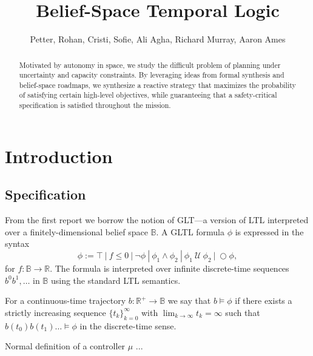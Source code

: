 \documentclass[conference]{IEEEtran}
\newcommand{\notltl}{\neg}
\newcommand{\andltl}{\wedge}
\newcommand{\Next}{\ensuremath{\bigcirc}}
\newcommand{\Until}{\ \mathcal{U}\ }
\newcommand{\True}{\top}
\begin{document}
\title{\huge Belief-Space Temporal Logic }

\author{Petter, Rohan, Cristi, Sofie, Ali Agha, Richard Murray, Aaron Ames}

\maketitle

\begin{abstract}
Motivated by autonomy in space, we study the difficult problem of planning under uncertainty and capacity constraints. By leveraging ideas from formal synthesis and belief-space roadmaps, we synthesize a reactive strategy that maximizes the probability of satisfying certain high-level objectives, while guaranteeing that a safety-critical specification is satisfied throughout the mission.  
\end{abstract}

\IEEEpeerreviewmaketitle

	
\section{Introduction} \label{subsec:intro}

\subsection{Specification}

From the first report we borrow the notion of GLT---a version of LTL interpreted over a finitely-dimensional belief space $\mathbb{B}$. A GLTL formula $\phi$ is expressed in the syntax
\begin{equation}
     \phi :=  \True \ |\ f \leq 0 \ |\ \notltl \phi \ |\ \phi_1 \andltl \phi_2 \ |\ \phi_1 \Until \phi_2 \ |\ \Next \phi,
\end{equation}
for $f : \mathbb{B} \rightarrow \mathbb{R}$. The formula is interpreted over infinite discrete-time sequences $b^0 b^1, \ldots$ in $\mathbb{B}$ using the standard LTL semantics. 

For a continuous-time trajectory $b : \mathbb{R}^+ \rightarrow \mathbb{B}$ we say that $b \models \phi$ if there exists a strictly increasing sequence $\{ t_k \}_{k=0}^\infty$ with $\lim_{k \rightarrow \infty} t_k = \infty$ such that $b(t_0) b(t_1) \ldots \models \phi$ in the discrete-time sense.

Normal definition of a controller $\mu$ ...
\end{document}
